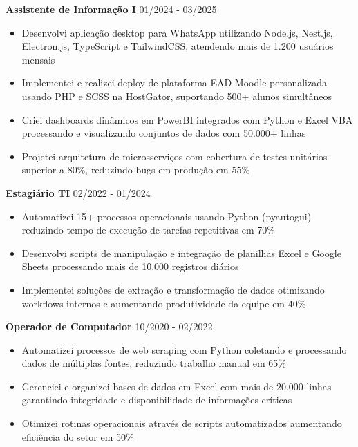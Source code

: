 \documentclass[a4paper,11pt]{article}
\begin{document}
\vspace{0.3em}
\noindent\textbf{Assistente de Informação I} \hfill {\color{light}\small 01/2024 - 03/2025}

\begin{itemize}[leftmargin=1.5em, itemsep=1pt, parsep=0pt, topsep=2pt]
  \item Desenvolvi aplicação desktop para WhatsApp utilizando Node.js, Nest.js, Electron.js, TypeScript e TailwindCSS, atendendo mais de 1.200 usuários mensais
  \item Implementei e realizei deploy de plataforma EAD Moodle personalizada usando PHP e SCSS na HostGator, suportando 500+ alunos simultâneos
  \item Criei dashboards dinâmicos em PowerBI integrados com Python e Excel VBA processando e visualizando conjuntos de dados com 50.000+ linhas
  \item Projetei arquitetura de microsserviços com cobertura de testes unitários superior a 80\%, reduzindo bugs em produção em 55\%
\end{itemize}

\vspace{0.3em}
\noindent\textbf{Estagiário TI} \hfill {\color{light}\small 02/2022 - 01/2024}

\begin{itemize}[leftmargin=1.5em, itemsep=1pt, parsep=0pt, topsep=2pt]
  \item Automatizei 15+ processos operacionais usando Python (pyautogui) reduzindo tempo de execução de tarefas repetitivas em 70\%
  \item Desenvolvi scripts de manipulação e integração de planilhas Excel e Google Sheets processando mais de 10.000 registros diários
  \item Implementei soluções de extração e transformação de dados otimizando workflows internos e aumentando produtividade da equipe em 40\%
\end{itemize}

\vspace{0.3em}
\noindent\textbf{Operador de Computador} \hfill {\color{light}\small 10/2020 - 02/2022}

\begin{itemize}[leftmargin=1.5em, itemsep=1pt, parsep=0pt, topsep=2pt]
  \item Automatizei processos de web scraping com Python coletando e processando dados de múltiplas fontes, reduzindo trabalho manual em 65\%
  \item Gerenciei e organizei bases de dados em Excel com mais de 20.000 linhas garantindo integridade e disponibilidade de informações críticas
  \item Otimizei rotinas operacionais através de scripts automatizados aumentando eficiência do setor em 50\%
\end{itemize}
\end{document}
